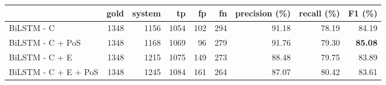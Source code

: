 \begin{tabular}{lrrrrrrrr}
    \toprule
    {}                   & gold & system &   tp &  fp &  fn & precision (\%) & recall (\%) & F1 (\%) \\
    \midrule
    BiLSTM - C           & 1348 &   1156 & 1054 & 102 & 294 &          91.18 &       78.19 &   84.19 \\
    BiLSTM - C + PoS     & 1348 &   1168 & 1069 &  96 & 279 &          91.76 &       79.30 &   \textbf{85.08} \\ 
    BiLSTM - C + E       & 1348 &   1215 & 1075 & 149 & 273 &          88.48 &       79.75 &   83.89 \\
    BiLSTM - C + E + PoS & 1348 &   1245 & 1084 & 161 & 264 &          87.07 &       80.42 &   83.61 \\
    \bottomrule
\end{tabular}